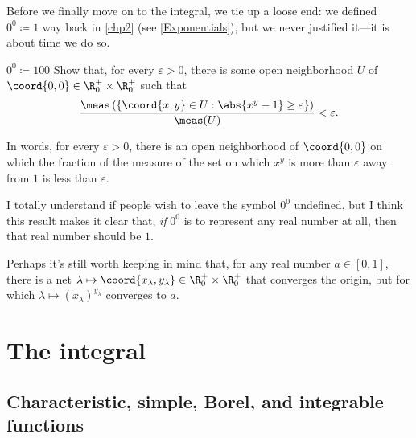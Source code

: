 Before we finally move on to the integral, we tie up a loose end:  we defined $0^0\coloneqq 1$ way back in \cref{chp2} (see \cref{Exponentials}), but we never justified it---it is about time we do so.
\begin{exr}{$0^0\coloneqq 1$}{00}
Show that, for every $\varepsilon >0$, there is some open neighborhood $U$ of $\coord{0,0}\in \R _0^+\times \R _0^+$ such that
\begin{equation}
\frac{\meas \left( \left\{ \coord{x,y}\in U:\abs{x^y-1}\geq \varepsilon \right\} \right)}{\meas (U)}<\varepsilon .
\end{equation}
\begin{rmk}
In words, for every $\varepsilon >0$, there is an open neighborhood of $\coord{0,0}$ on which the fraction of the measure of the set on which $x^y$ is more than $\varepsilon$ away from $1$ is less than $\varepsilon$.
\end{rmk}
\begin{rmk}
I totally understand if people wish to leave the symbol $0^0$ undefined, but I think this result makes it clear that, \emph{if} $0^0$ is to represent any real number at all, then that real number should be $1$.
\end{rmk}
\begin{rmk}
Perhaps it's still worth keeping in mind that, for any real number $a\in [0,1]$, there is a net $\lambda \mapsto \coord{x_\lambda ,y_\lambda}\in \R _0^+\times \R _0^+$ that converges the origin, but for which $\lambda \mapsto (x_\lambda )^{y_\lambda}$ converges to $a$.
\end{rmk}
\end{exr}

\section{The integral}


\subsection{Characteristic, simple, Borel, and integrable functions}

